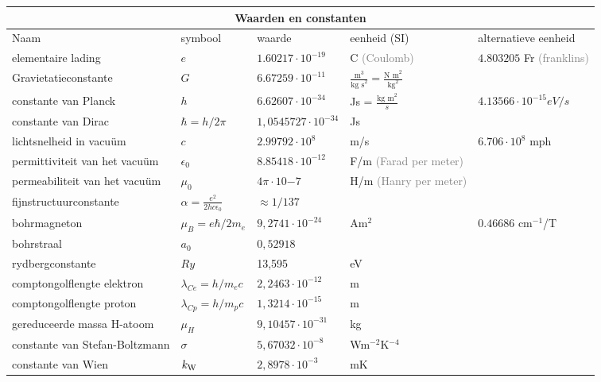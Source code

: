 \documentclass[dutch]{report}
\newcommand{\note}[1]{\textcolor{gray}{\tiny (#1)}}
\begin{document}
\centering
{
    \begin{tabular}{ l | l l l l}
        \hline
        \multicolumn{5}{c}{\huge{Waarden en constanten}} \\
        \hline
        Naam & symbool & waarde & eenheid (SI) & alternatieve eenheid \\
        \hline
        elementaire lading & $e$ & $1.60217\cdot 10^{-19}$ & C \note{Coulomb} & $4.803205$ Fr
        \note{franklins}\\
        Gravietatieconstante & $G$ & $6.67259\cdot 10^{-11}$ & $\frac{\text{m}^3}{\text{kg s}^2} =
        \frac{\text{N m}^2}{\text{kg}^2}$ & \\
        constante van Planck & $h$ & $6.62607\cdot 10^{-34}$ & Js = $\frac{\text{kg m}^2}{s}$ &
        $4.13566\cdot10^{-15}eV/s$ \\
        constante van Dirac & $\hbar=h/2\pi$ & $1,0545727\cdot10^{-34}$ & Js & \\
        lichtsnelheid in vacu\"um & $c$ & $2.99792\cdot10^8$ & m/s & $6.706\cdot10^8$ mph\\
        permittiviteit van het vacu\"um & $\epsilon_0$ & $8.85418\cdot10^{-12}$ & F/m
        \note{Farad per meter} & \\
        permeabiliteit van het vacu\"um & $\mu_0$ & $4\pi\cdot10{-7}$ & H/m \note{Hanry per meter} &
        \\
        fijnstructuurconstante & $\alpha = \frac{e^2}{2hc\epsilon_0}$ & $\approx 1/137$ & & \\ %
        bohrmagneton & $\mu_{B}=e\hbar/2m_{e}$ & $9,2741\cdot10^{-24}$ & Am$^2$ & $0.46686 \text{ cm}^{-1}$/T \\
        bohrstraal & $a_0$ & $0,52918$ & & \\
        rydbergconstante & $Ry$ & 13,595 & eV & \\
        comptongolflengte elektron & $\lambda_{Ce}=h/m_{e} c$ & $2,2463\cdot10^{-12}$
        & m & \\
        comptongolflengte proton & $\lambda_{Cp}=h/m_{p}c$ & $1,3214\cdot10^{-15}$
        & m & \\
        gereduceerde massa H-atoom & $\mu_{H}$ & $9,10457\cdot10^{-31}$ & kg & \\
        constante van Stefan-Boltzmann
        &$\sigma$ & $5,67032\cdot10^{-8}$ & Wm$^{-2}$K$^{-4}$ & \\
        constante van Wien & $k_{\rm W}$ & $2,8978\cdot10^{-3}$ & mK & \\
        \hline

\end{tabular}}
\end{document}
